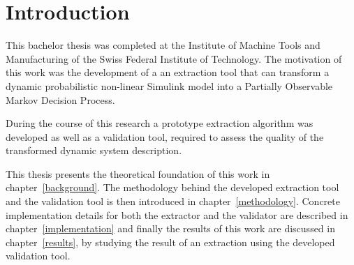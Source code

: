 \setcounter{chapter}{0}

\chapter{Introduction}

This bachelor thesis was completed at the Institute of Machine Tools and Manufacturing of the Swiss Federal Institute of Technology. The motivation of this work was the development of a an extraction tool that can transform a dynamic probabilistic non-linear Simulink model into a Partially Observable Markov Decision Process.

During the course of this research a prototype extraction algorithm was developed as well as a validation tool, required to assess the quality of the transformed dynamic system description.

This thesis presents the theoretical foundation of this work in chapter~\ref{background}. The methodology behind the developed extraction tool and the validation tool is then introduced in chapter~\ref{methodology}. Concrete implementation details for both the extractor and the validator are described in chapter~\ref{implementation} and finally the results of this work are discussed in chapter~\ref{results}, by studying the result of an extraction using the developed validation tool.
